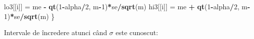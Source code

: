 \documentclass[]{article}
\newenvironment{Shaded}{\begin{snugshade}}{\end{snugshade}}
\newcommand{\KeywordTok}[1]{\textcolor[rgb]{0.13,0.29,0.53}{\textbf{#1}}}
\newcommand{\DecValTok}[1]{\textcolor[rgb]{0.00,0.00,0.81}{#1}}
\newcommand{\StringTok}[1]{\textcolor[rgb]{0.31,0.60,0.02}{#1}}
\newcommand{\OperatorTok}[1]{\textcolor[rgb]{0.81,0.36,0.00}{\textbf{#1}}}
\newcommand{\NormalTok}[1]{#1}
\begin{document}
\begin{Shaded}
\begin{Highlighting}[]
\NormalTok{  lo3[[i]] =}\StringTok{ }\NormalTok{me }\OperatorTok{-}\StringTok{ }\KeywordTok{qt}\NormalTok{(}\DecValTok{1}\OperatorTok{-}\NormalTok{alpha}\OperatorTok{/}\DecValTok{2}\NormalTok{, m}\OperatorTok{-}\DecValTok{1}\NormalTok{)}\OperatorTok{*}\NormalTok{se}\OperatorTok{/}\KeywordTok{sqrt}\NormalTok{(m)}
\NormalTok{  hi3[[i]] =}\StringTok{ }\NormalTok{me }\OperatorTok{+}\StringTok{ }\KeywordTok{qt}\NormalTok{(}\DecValTok{1}\OperatorTok{-}\NormalTok{alpha}\OperatorTok{/}\DecValTok{2}\NormalTok{, m}\OperatorTok{-}\DecValTok{1}\NormalTok{)}\OperatorTok{*}\NormalTok{se}\OperatorTok{/}\KeywordTok{sqrt}\NormalTok{(m)}
\NormalTok{\}}
\end{Highlighting}
\end{Shaded}

Intervale de încredere atunci când \(\sigma\) este cunoscut:
\end{document}
